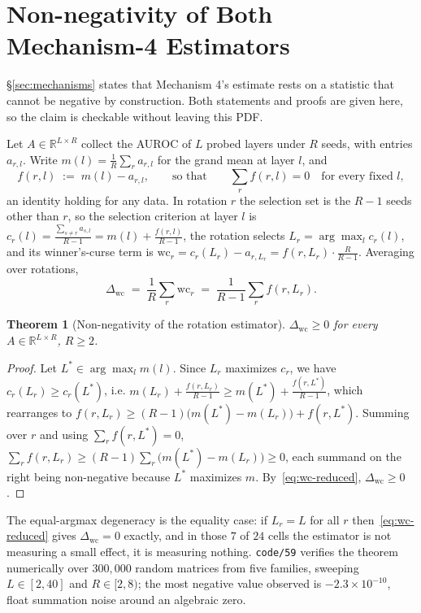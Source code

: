 \documentclass{article}
\newtheorem{theorem}{Theorem}
\begin{document}
\section{Non-negativity of Both Mechanism-4 Estimators}
\label{app:nonneg}

\S\ref{sec:mechanisms} states that Mechanism 4's estimate rests on a statistic
that cannot be negative by construction. Both statements and proofs are given
here, so the claim is checkable without leaving this PDF.

Let $A\in\mathbb{R}^{L\times R}$ collect the AUROC of $L$ probed layers under
$R$ seeds, with entries $a_{r,l}$. Write $m(l)=\tfrac{1}{R}\sum_r a_{r,l}$ for
the grand mean at layer $l$, and
\[
f(r,l)\;:=\;m(l)-a_{r,l},
\qquad\text{so that}\qquad
\sum_{r} f(r,l)=0 \quad\text{for every fixed } l,
\]
an identity holding for any data. In rotation $r$ the selection set is the
$R-1$ seeds other than $r$, so the selection criterion at layer $l$ is
$c_r(l)=\frac{\sum_{s\neq r} a_{s,l}}{R-1}=m(l)+\frac{f(r,l)}{R-1}$, the
rotation selects $L_r=\arg\max_l c_r(l)$, and its winner's-curse term is
$\text{wc}_r=c_r(L_r)-a_{r,L_r}=f(r,L_r)\cdot\tfrac{R}{R-1}$. Averaging over
rotations,
\begin{equation}
\Delta_{\text{wc}}
\;=\;\frac{1}{R}\sum_{r}\text{wc}_r
\;=\;\frac{1}{R-1}\sum_{r} f(r,L_r).
\label{eq:wc-reduced}
\end{equation}

\begin{theorem}[Non-negativity of the rotation estimator]
\label{thm:wc-nonneg}
$\Delta_{\text{wc}}\ge 0$ for every $A\in\mathbb{R}^{L\times R}$, $R\ge2$.
\end{theorem}

\begin{proof}
Let $L^{*}\in\arg\max_l m(l)$. Since $L_r$ maximizes $c_r$, we have
$c_r(L_r)\ge c_r(L^{*})$, i.e.
$m(L_r)+\tfrac{f(r,L_r)}{R-1}\ge m(L^{*})+\tfrac{f(r,L^{*})}{R-1}$, which
rearranges to
$f(r,L_r)\ge (R-1)\bigl(m(L^{*})-m(L_r)\bigr)+f(r,L^{*})$. Summing over $r$
and using $\sum_r f(r,L^{*})=0$,
$\sum_{r} f(r,L_r)\ge(R-1)\sum_{r}\bigl(m(L^{*})-m(L_r)\bigr)\ge 0$,
each summand on the right being non-negative because $L^{*}$ maximizes $m$.
By~\eqref{eq:wc-reduced}, $\Delta_{\text{wc}}\ge0$.
\end{proof}

The equal-argmax degeneracy is the equality case: if $L_r=L$ for all $r$
then~\eqref{eq:wc-reduced} gives $\Delta_{\text{wc}}=0$ exactly, and in those
$7$ of $24$ cells the estimator is not measuring a small effect, it is
measuring nothing. \texttt{code/59} verifies the theorem numerically over
$300{,}000$ random matrices from five families, sweeping $L\in[2,40]$ and
$R\in[2,8)$; the most negative value observed is $-2.3\times10^{-10}$, float
summation noise around an algebraic zero.
\end{document}
